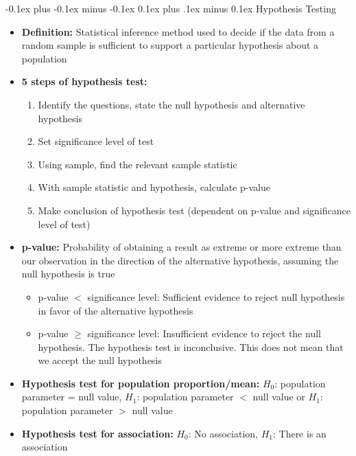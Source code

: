 \documentclass[landscape]{article}
\makeatletter
\renewcommand{\subsection}{\@startsection{subsection}{2}{0mm}%
  {-0.1ex plus -0.1ex minus -0.1ex}%
  {0.1ex plus .1ex minus 0.1ex}%
{\normalfont\scriptsize\bfseries}}
\makeatother
\begin{document}
\begin{multicols*}{5}
    \subsection{Hypothesis Testing}
    \begin{itemize}
      \item \textbf{Definition:} Statistical inference method used to decide if the data from a random sample is sufficient to support a particular hypothesis about a population
      \item \textbf{5 steps of hypothesis test:}
      \begin{enumerate}
        \item Identify the questions, state the null hypothesis and alternative hypothesis
        \item Set significance level of test
        \item Using sample, find the relevant sample statistic
        \item With sample statistic and hypothesis, calculate p-value
        \item Make conclusion of hypothesis test (dependent on p-value and significance level of test)
      \end{enumerate}
      \item \textbf{p-value:} Probability of obtaining a result as extreme or more extreme than our observation in the direction of the alternative hypothesis, assuming the null hypothesis is true
      \begin{itemize}
        \item p-value $<$ significance level: Sufficient evidence to reject null hypothesis in favor of the alternative hypothesis
        \item p-value $\geq$ significance level: Insufficient evidence to reject the null hypothesis. The hypothesis test is inconclusive. This does not mean that we accept the null hypothesis
      \end{itemize}
      \item \textbf{Hypothesis test for population proportion/mean:} $H_0$: population parameter = null value, $H_1$: population parameter $<$ null value or $H_1$: population parameter $>$ null value
      \item \textbf{Hypothesis test for association:} $H_0$: No association, $H_1$: There is an association
    \end{itemize}
\end{multicols*}
\end{document}
